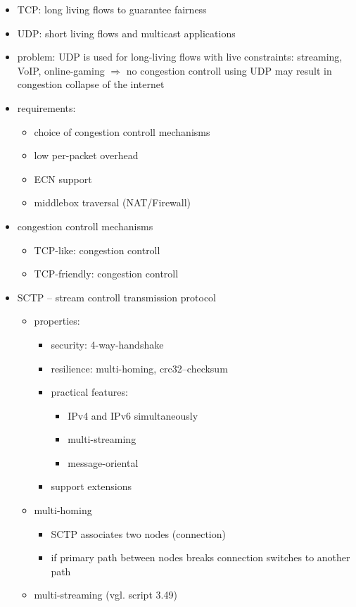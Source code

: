 \documentclass[a4paper,10pt]{scrreprt}
\begin{document}
\begin{itemize}
 \begin{itemize}
  \item TCP: long living flows to guarantee fairness
  \item UDP: short living flows and multicast applications
  \item problem: UDP is used for long-living flows with live constraints: streaming, VoIP, online-gaming $\Rightarrow$ no congestion controll using UDP may result in congestion collapse of the internet
  \item requirements: 
  \begin{itemize}
   \item choice of congestion controll mechanisms
   \item low per-packet overhead
   \item ECN support
   \item middlebox traversal (NAT/Firewall)
  \end{itemize}
  \item congestion controll mechanisms
  \begin{itemize}
   \item TCP-like: congestion controll
   \item TCP-friendly: congestion controll
  \end{itemize}
  \item SCTP -- stream controll transmission protocol
  \begin{itemize}
   \item properties:
   \begin{itemize}
    \item security: 4-way-handshake
    \item resilience: multi-homing, crc32--checksum
    \item practical features: 
    \begin{itemize}
     \item IPv4 and IPv6 simultaneously
     \item multi-streaming
     \item message-oriental
    \end{itemize}
    \item support extensions
   \end{itemize}
   \item multi-homing
   \begin{itemize}
    \item SCTP associates two nodes (connection)
    \item if primary path between nodes breaks connection switches to another path
   \end{itemize}
   \item multi-streaming (vgl. script 3.49)
 \end{itemize}
 \end{itemize}

\end{itemize}
\end{document}
